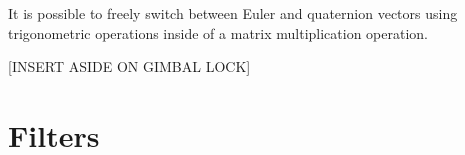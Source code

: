It is possible to freely switch between Euler and quaternion vectors using trigonometric operations inside of a matrix multiplication operation.

[INSERT ASIDE ON GIMBAL LOCK]

\section{Filters} \label{sec:bkg_filters}
